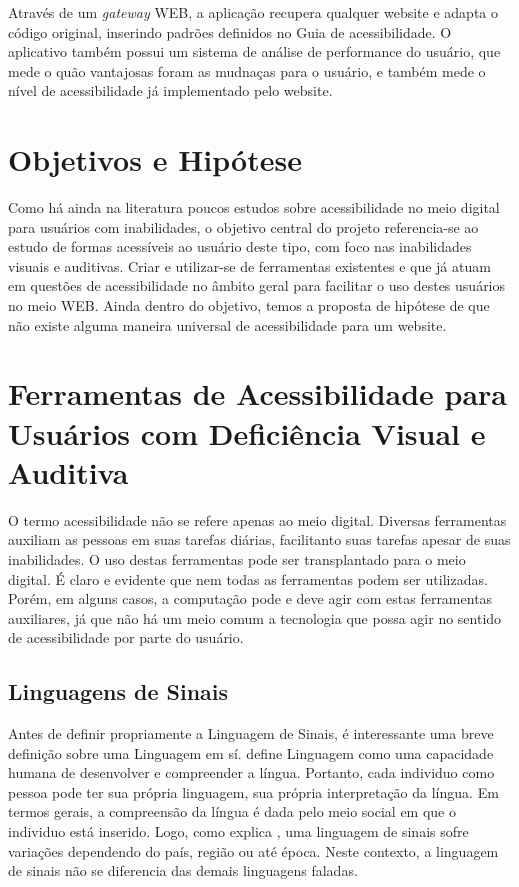 \documentclass[
	12pt,				%
	oneside,			%
	a4paper,			%
	english,			%
	brazil				%
	]{abntex2ppgsi}
\begin{document}
Através de um \textit{gateway} WEB, a aplicação recupera qualquer website e adapta o código original, inserindo padrões definidos no Guia de acessibilidade. O aplicativo também possui um sistema de análise de performance do usuário, que mede o quão vantajosas foram as mudnaças para o usuário, e também mede o nível de acessibilidade já implementado pelo website.

\chapter{Objetivos e Hipótese}

Como há ainda na literatura poucos estudos sobre acessibilidade no meio digital para usuários com inabilidades, o objetivo central do projeto referencia-se ao estudo de formas acessíveis ao usuário deste tipo, com foco nas inabilidades visuais e auditivas. Criar e utilizar-se de ferramentas existentes e que já atuam em questões de acessibilidade no âmbito geral para facilitar o uso destes usuários no meio WEB. 
Ainda dentro do objetivo, temos a proposta de hipótese de que não existe alguma maneira universal de acessibilidade para um website. 


\chapter{Ferramentas de Acessibilidade para Usuários com Deficiência Visual e Auditiva}

O termo acessibilidade não se refere apenas ao meio digital. Diversas ferramentas auxiliam as pessoas em suas tarefas diárias, facilitanto suas tarefas apesar de suas inabilidades. O uso destas ferramentas pode ser transplantado para o meio digital. É claro e evidente que nem todas as ferramentas podem ser utilizadas. Porém, em alguns casos, a computação pode e deve agir com estas ferramentas auxiliares, já que não há um meio comum a tecnologia que possa agir no sentido de acessibilidade por parte do usuário. 

\section{Linguagens de Sinais}

Antes de definir propriamente a Linguagem de Sinais, é interessante uma breve definição sobre uma Linguagem em sí.  define Linguagem como uma capacidade humana de desenvolver e compreender a língua. Portanto, cada individuo como pessoa pode ter sua própria linguagem, sua própria interpretação da língua. Em termos gerais, a compreensão da língua é dada pelo meio social em que o individuo está inserido. Logo, como explica , uma linguagem de sinais sofre variações dependendo do país, região ou até época. Neste contexto, a linguagem de sinais não se diferencia das demais linguagens faladas.
\end{document}
